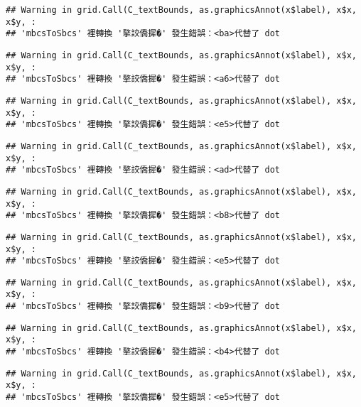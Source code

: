 \documentclass[
]{article}
\begin{document}
\begin{verbatim}
## Warning in grid.Call(C_textBounds, as.graphicsAnnot(x$label), x$x, x$y, :
## 'mbcsToSbcs' 裡轉換 '摮詨僑摨�' 發生錯誤：<ba>代替了 dot
\end{verbatim}

\begin{verbatim}
## Warning in grid.Call(C_textBounds, as.graphicsAnnot(x$label), x$x, x$y, :
## 'mbcsToSbcs' 裡轉換 '摮詨僑摨�' 發生錯誤：<a6>代替了 dot
\end{verbatim}

\begin{verbatim}
## Warning in grid.Call(C_textBounds, as.graphicsAnnot(x$label), x$x, x$y, :
## 'mbcsToSbcs' 裡轉換 '摮詨僑摨�' 發生錯誤：<e5>代替了 dot
\end{verbatim}

\begin{verbatim}
## Warning in grid.Call(C_textBounds, as.graphicsAnnot(x$label), x$x, x$y, :
## 'mbcsToSbcs' 裡轉換 '摮詨僑摨�' 發生錯誤：<ad>代替了 dot
\end{verbatim}

\begin{verbatim}
## Warning in grid.Call(C_textBounds, as.graphicsAnnot(x$label), x$x, x$y, :
## 'mbcsToSbcs' 裡轉換 '摮詨僑摨�' 發生錯誤：<b8>代替了 dot
\end{verbatim}

\begin{verbatim}
## Warning in grid.Call(C_textBounds, as.graphicsAnnot(x$label), x$x, x$y, :
## 'mbcsToSbcs' 裡轉換 '摮詨僑摨�' 發生錯誤：<e5>代替了 dot
\end{verbatim}

\begin{verbatim}
## Warning in grid.Call(C_textBounds, as.graphicsAnnot(x$label), x$x, x$y, :
## 'mbcsToSbcs' 裡轉換 '摮詨僑摨�' 發生錯誤：<b9>代替了 dot
\end{verbatim}

\begin{verbatim}
## Warning in grid.Call(C_textBounds, as.graphicsAnnot(x$label), x$x, x$y, :
## 'mbcsToSbcs' 裡轉換 '摮詨僑摨�' 發生錯誤：<b4>代替了 dot
\end{verbatim}

\begin{verbatim}
## Warning in grid.Call(C_textBounds, as.graphicsAnnot(x$label), x$x, x$y, :
## 'mbcsToSbcs' 裡轉換 '摮詨僑摨�' 發生錯誤：<e5>代替了 dot
\end{verbatim}
\end{document}
